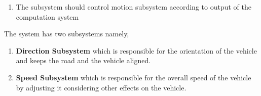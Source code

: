 \documentclass[a4paper,12pt]{article}
\begin{document}
	\begin{enumerate}
		\item The subsystem should control motion subsystem according to output of the computation system		
	\end{enumerate}

	The system has two subsystems namely,
		
	\begin{enumerate}
		\item \textbf{Direction Subsystem} which is responsible for the orientation of the vehicle and keeps the road and the vehicle aligned.
		\item \textbf{Speed Subsystem} which is responsible for the overall speed of the vehicle by adjusting it considering other effects on the vehicle.
	\end{enumerate}
\end{document}
